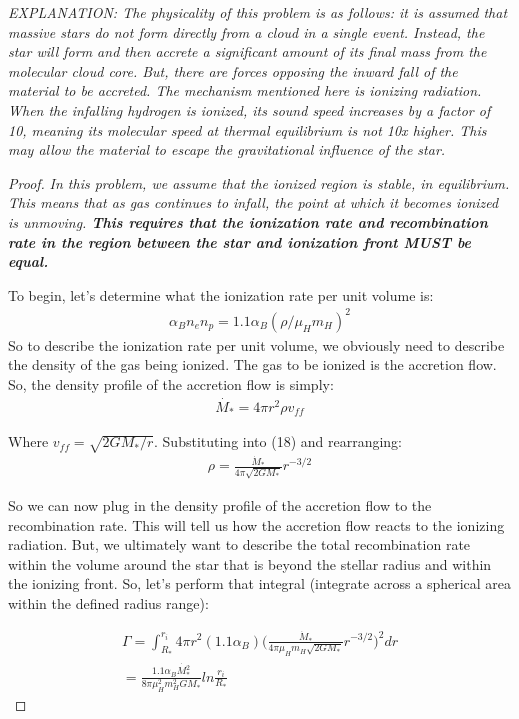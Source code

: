 \documentclass[10pt]{article}
\begin{document}
\textit{EXPLANATION: The physicality of this problem is as follows: it is assumed that massive stars do not form directly from a cloud in a single event. Instead, the star will form and then accrete a significant amount of its final mass from the molecular cloud core. But, there are forces opposing the inward fall of the material to be accreted. The mechanism mentioned here is ionizing radiation. When the infalling hydrogen is ionized, its sound speed increases by a factor of 10, meaning its molecular speed at thermal equilibrium is not 10x higher. This may allow the material to escape the gravitational influence of the star.}
\begin{proof}
\textit{In this problem, we assume that the ionized region is stable, in equilibrium. This means that as gas continues to infall, the point at which it becomes ionized is unmoving. \textbf{This requires that the ionization rate and recombination rate in the region between the star and ionization front MUST be equal.}}

To begin, let's determine what the ionization rate per unit volume is:
\begin{align}
\alpha_{B}n_{e}n_{p} = 1.1\alpha_{B}(\rho / \mu_{H} m_{H})^2
\end{align}
So to describe the ionization rate per unit volume, we obviously need to describe the density of the gas being ionized. The gas to be ionized is the accretion flow. So, the density profile of the accretion flow is simply:
\begin{align}
\dot{M_{*}} = 4\pi r^2 \rho v_{ff}
\end{align}

Where $v_{ff} = \sqrt{2GM_{*}/r}$. Substituting into (18) and rearranging:
\begin{align}
\rho = \frac{\dot{M}_{*}}{4\pi \sqrt{2GM_{*}}}r^{-3/2}
\end{align}

So we can now plug in the density profile of the accretion flow to the recombination rate. This will tell us how the accretion flow reacts to the ionizing radiation. But, we ultimately want to describe the total recombination rate within the volume around the star that is beyond the stellar radius and within the ionizing front. So, let's perform that integral (integrate across a spherical area within the defined radius range):

\begin{align}
\Gamma = \int^{r_{i}}_{R_{*}} 4\pi r^2 (1.1\alpha_{B})\bigg(\frac{\dot{M}_{*}}{4\pi \mu_{H}m_{H}\sqrt{2GM_{*}}}r^{-3/2}\bigg)^2 dr \\
	= \frac{1.1\alpha_{B}\dot{M_{*}^2}}{8\pi\mu_{H}^2 m_{H}^2 GM_{*}}ln\frac{r_{i}}{R_{*}}
\end{align} 


\end{proof}
\end{document}
